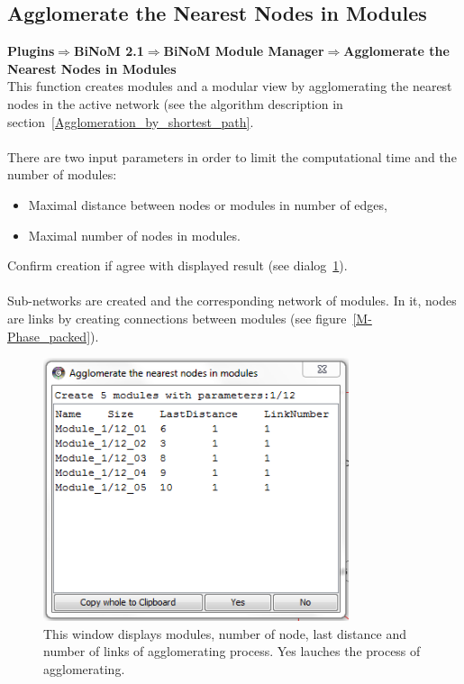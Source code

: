 \subsection{Agglomerate the Nearest Nodes in Modules}
\textbf{Plugins$\Rightarrow$BiNoM 2.1$\Rightarrow$BiNoM Module Manager$\Rightarrow$Agglomerate the Nearest Nodes in Modules}\\
This function creates modules and a modular view by agglomerating the nearest nodes in the active network (see the algorithm description in section~\ref{Agglomeration_by_shortest_path}.\\\\
There are two input parameters in order to limit the computational time and the number of modules:
\begin{itemize}
\item Maximal distance between nodes or modules in number of edges,
\item Maximal number of nodes in modules.
\end{itemize}
Confirm creation if agree with displayed result (see dialog~\ref{Agglomerate_in_modules_dialog}).\\\\
Sub-networks are created and the corresponding network of modules. In it, nodes are links by creating connections between modules  (see figure~\ref{M-Phase_packed}).
\begin{figure}
\centering
\includegraphics[width=0.8\textwidth]{graphics/Agglomerate_in_modules_dialog}
\caption{This window displays modules, number of node, last distance and number of links of agglomerating process. Yes lauches the process of agglomerating.}
\label{Agglomerate_in_modules_dialog}
\end{figure}
